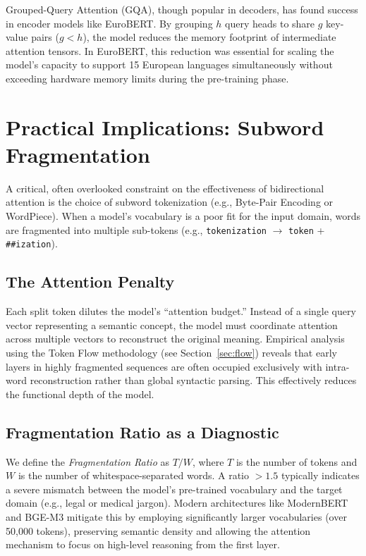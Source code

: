 \documentclass[11pt]{article}
\begin{document}
Grouped-Query Attention (GQA), though popular in decoders, has found success in encoder models like EuroBERT. By grouping $h$ query heads to share $g$ key-value pairs ($g < h$), the model reduces the memory footprint of intermediate attention tensors. In EuroBERT, this reduction was essential for scaling the model's capacity to support 15 European languages simultaneously without exceeding hardware memory limits during the pre-training phase.

\section{Practical Implications: Subword Fragmentation}

A critical, often overlooked constraint on the effectiveness of bidirectional attention is the choice of subword tokenization (e.g., Byte-Pair Encoding or WordPiece). When a model's vocabulary is a poor fit for the input domain, words are fragmented into multiple sub-tokens (e.g., \texttt{tokenization} $\rightarrow$ \texttt{token} + \texttt{\#\#ization}).

\subsection{The Attention Penalty}

Each split token dilutes the model's ``attention budget.'' Instead of a single query vector representing a semantic concept, the model must coordinate attention across multiple vectors to reconstruct the original meaning. Empirical analysis using the Token Flow methodology (see Section~\ref{sec:flow}) reveals that early layers in highly fragmented sequences are often occupied exclusively with intra-word reconstruction rather than global syntactic parsing. This effectively reduces the functional depth of the model.

\subsection{Fragmentation Ratio as a Diagnostic}

We define the \emph{Fragmentation Ratio} as $T / W$, where $T$ is the number of tokens and $W$ is the number of whitespace-separated words. A ratio $> 1.5$ typically indicates a severe mismatch between the model's pre-trained vocabulary and the target domain (e.g., legal or medical jargon). Modern architectures like ModernBERT and BGE-M3 mitigate this by employing significantly larger vocabularies (over 50,000 tokens), preserving semantic density and allowing the attention mechanism to focus on high-level reasoning from the first layer.
\end{document}
